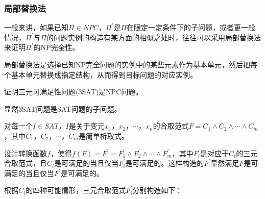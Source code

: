 \documentclass[./../main.tex]{subfiles}
\begin{document}
\subsubsection{局部替换法}
一般来讲，如果已知$\Pi \in NPC$，$\Pi^{\prime}$是$\Pi$在限定一定条件下的子问题，或者更一般情况，$\Pi^{\prime}$与$\Pi$的问题实例的构造有某方面的相似之处时，往往可以采用局部替换法来证明$\Pi^{\prime}$的NP完全性。

局部替换法是选择已知NP完全问题的实例中的某些元素作为基本单元，然后把每个基本单元替换成指定结构，从而得到目标问题的对应实例。

证明三元可满足性问题(3SAT)是NPC问题。

显然3SAT问题是SAT问题的子问题。

对每一个$I \in SAT$，$I$是关于变元$x_{1}$，$x_{2}$，$\cdots$，$x_{n}$的合取范式$F = C_{1} \wedge C_{2} \wedge \cdots \wedge C_{m}$，其中$C_{1}$，$C_{2}$，$\cdots$，$C_{m}$是简单析取式。

设计转换函数$f$，使得$f(F) = F^{\prime} = F_{1}^{\prime} \wedge F_{2}^{\prime} \wedge \cdots \wedge F_{m}^{\prime}$，其中$F_{i}^{\prime}$是对应于$C_{i}$的三元合取范式，且$C_{i}$是可满足的当且仅当$F_{i}^{\prime}$是可满足的。这样构造的$F^{\prime}$显然满足$F$是可满足的当且仅当$F^{\prime}$是可满足的。

根据$C_{i}$的四种可能情形，三元合取范式$F_{i}^{\prime}$分别构造如下：
\end{document}

